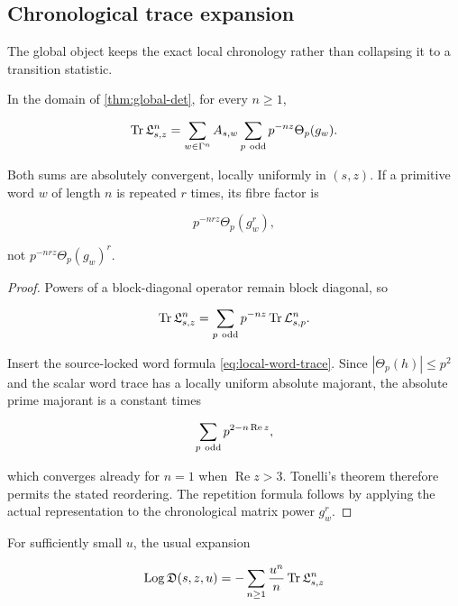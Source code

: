 \subsection{Chronological trace expansion}

The global object keeps the exact local chronology rather than collapsing it
to a transition statistic.

\begin{proposition}
\label{prop:chronological-trace}
In the domain of \cref{thm:global-det}, for every \(n\ge1\),

\begin{equation}
 \operatorname{Tr}\mathfrak L_{s,z}^n
 =\sum_{w\in\Gamma^n}A_{s,w}
   \sum_{p\ \mathrm{odd}}p^{-nz}\Theta_p(g_w).
 \label{eq:global-word-trace}
\end{equation}

Both sums are absolutely convergent, locally uniformly in \((s,z)\).  If a
primitive word \(w\) of length \(n\) is repeated \(r\) times, its fibre
factor is

\begin{equation}
 p^{-nrz}\Theta_p(g_w^r),
 \label{eq:repetition}
\end{equation}

not \(p^{-nrz}\Theta_p(g_w)^r\).
\end{proposition}

\begin{proof}
Powers of a block-diagonal operator remain block diagonal, so

\[
 \operatorname{Tr}\mathfrak L_{s,z}^n
 =\sum_{p\ \mathrm{odd}}p^{-nz}\operatorname{Tr}\mathcal L_{s,p}^n.
\]

Insert the source-locked word formula \cref{eq:local-word-trace}.  Since
\(|\Theta_p(h)|\le p^2\) and the scalar word trace has a locally uniform
absolute majorant, the absolute prime majorant is a constant times

\[
 \sum_{p\ \odd}p^{2-n\operatorname{Re}z},
\]

which converges already for \(n=1\) when
\(\operatorname{Re}z>3\).  Tonelli's theorem therefore permits the stated
reordering.  The repetition formula follows by applying the actual
representation to the chronological matrix power \(g_w^r\).
\end{proof}

For sufficiently small \(u\), the usual expansion

\begin{equation}
 \operatorname{Log}\mathfrak D(s,z,u)
 =-\sum_{n\ge1}\frac{u^n}{n}\operatorname{Tr}\mathfrak L_{s,z}^n
 \label{eq:global-log}
\end{equation}

